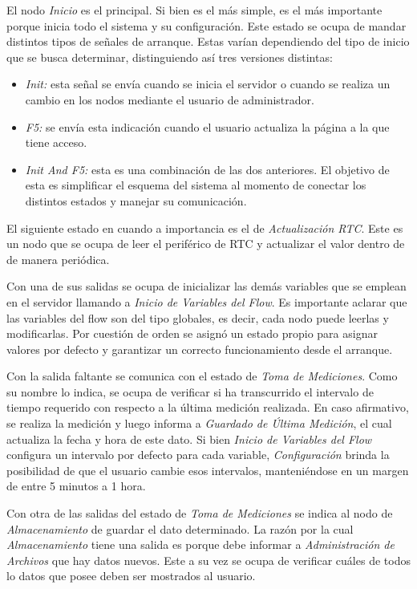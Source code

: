 
El nodo \textit{Inicio} es el principal. Si bien es el más simple, es el más importante porque inicia todo el sistema y su configuración. Este estado se ocupa de mandar distintos tipos de señales de arranque. Estas varían dependiendo del tipo de inicio que se busca determinar, distinguiendo así tres versiones distintas:
\begin{itemize}
	\item \textit{Init:} esta señal se envía cuando se inicia el servidor o cuando se realiza un cambio en los nodos mediante el usuario de administrador.
	\item \textit{F5:} se envía esta indicación cuando el usuario actualiza la página a la que tiene acceso.
	\item \textit{Init And F5:} esta es una combinación de las dos anteriores. El objetivo de esta es simplificar el esquema del sistema al momento de conectar los distintos estados y manejar su comunicación.
\end{itemize}

El siguiente estado en cuando a importancia es el de \textit{Actualización RTC}. Este es un nodo que se ocupa de leer el periférico de RTC y actualizar el valor dentro de \nodered de manera periódica.

Con una de sus salidas se ocupa de inicializar las demás variables que se emplean en el servidor llamando a \textit{Inicio de Variables del Flow}. Es importante aclarar que las variables del flow son del tipo globales, es decir, cada nodo puede leerlas y modificarlas. Por cuestión de orden se asignó un estado propio para asignar valores por defecto y garantizar un correcto funcionamiento desde el arranque.

Con la salida faltante se comunica con el estado de \textit{Toma de Mediciones}. Como su nombre lo indica, se ocupa de verificar si ha transcurrido el intervalo de tiempo requerido con respecto a la última medición realizada. En caso afirmativo, se realiza la medición y luego informa a \textit{Guardado de Última Medición}, el cual actualiza la fecha y hora de este dato. Si bien \textit{Inicio de Variables del Flow} configura un intervalo por defecto para cada variable, \textit{Configuración} brinda la posibilidad de que el usuario cambie esos intervalos, manteniéndose en un margen de entre 5 minutos a 1 hora.

Con otra de las salidas del estado de \textit{Toma de Mediciones} se indica al nodo de \textit{Almacenamiento} de guardar el dato determinado. La razón por la cual \textit{Almacenamiento} tiene una salida es porque debe informar a \textit{Administración de Archivos} que hay datos nuevos. Este a su vez se ocupa de verificar cuáles de todos lo datos que posee deben ser mostrados al usuario. 

